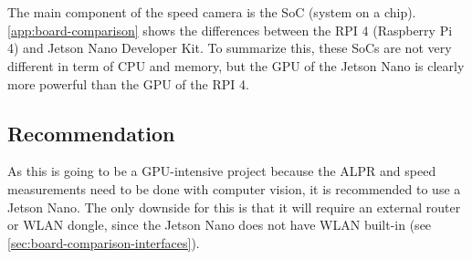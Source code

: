 \chapter{}
\label{chap:development-board}

The main component of the speed camera is the SoC (system on a chip). 
\cref{app:board-comparison} shows the differences between the RPI 4 (Raspberry Pi 4) and Jetson Nano Developer Kit.
To summarize this, these SoCs are not very different in term of CPU and memory, but the GPU of the Jetson Nano is clearly more powerful than the GPU of the RPI 4.

\section{Recommendation}

As this is going to be a GPU-intensive project because the ALPR and speed measurements need to be done with computer vision, it is recommended to use a Jetson Nano.
The only downside for this is that it will require an external router or WLAN dongle, since the Jetson Nano does not have WLAN built-in (see \cref{sec:board-comparison-interfaces}).
